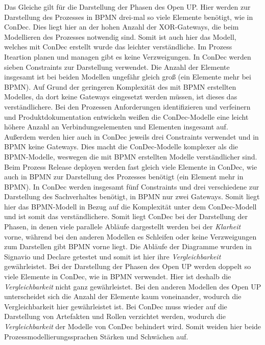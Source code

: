 Das Gleiche gilt für die Darstellung der Phasen des Open UP. Hier werden zur Darstellung des Prozesses in BPMN drei-mal so viele Elemente benötigt, wie in ConDec. Dies liegt hier an der hohen Anzahl der XOR-Gateways, die beim Modellieren des Prozesses notwendig sind. Somit ist auch hier das Modell, welches mit ConDec erstellt wurde das leichter verständliche. \newline
Im Prozess Iteartion planen und managen gibt es keine Verzweigungen. In ConDec werden sieben Constraints zur Darstellung verwendet. Die Anzahl der Elemente insgesamt ist bei beiden Modellen ungefähr gleich groß (ein Elemente mehr bei BPMN). Auf Grund der geringeren Komplexität des mit BPMN erstellten Modelles, da dort keine Gateways eingesetzt werden müssen, ist dieses das verständlichere.\newline
Bei den Prozessen Anforderungen identifizieren und verfeinern und Produktdokumentation entwickeln weißen die ConDec-Modelle eine leicht höhere Anzahl an Verbindungselementen und Elementen insgesamt auf. Außerdem werden hier auch in ConDec jeweils drei Constraints verwendet und in BPMN keine Gateways. Dies macht die ConDec-Modelle komplexer als die BPMN-Modelle, weswegen die mit BPMN erstellten Modelle verständlicher sind.\newline
Beim Prozess Release deployen werden fast gleich viele Elemente in ConDec, wie auch in BPMN zur Darstellung des Prozesses benötigt (ein Element mehr in BPMN). In ConDec werden insgesamt fünf Constraints und drei verschiedene zur Darstellung des Sachverhaltes benötigt, in BPMN nur zwei Gateways. Somit liegt hier das BPMN-Modell in Bezug auf die Komplexität unter dem ConDec-Modell und ist somit das verständlichere.\newline
Somit liegt ConDec bei der Darstellung der Phasen, in denen viele parallele Abläufe dargestellt werden bei der \textit{Klarheit} vorne, während bei den anderen Modellen es Schleifen oder keine Verzweigungen zum Darstellen gibt BPMN vorne liegt.\newline
Die Abläufe der Diagramme wurden in Signavio und Declare getestet und somit ist hier ihre \textit{Vergleichbarkeit} gewährleistet.\newline
Bei der Darstellung der Phasen des Open UP werden doppelt so viele Elemente in ConDec, wie in BPMN verwendet. Hier ist deshalb die \textit{Vergleichbarkeit} nicht ganz gewährleistet. Bei den anderen Modellen des Open UP unterscheidet sich die Anzahl der Elemente kaum voneinander, wodurch die Vergleichbarkeit hier gewährleistet ist. \newline
Bei ConDec muss wieder auf die Darstellung von Artefakten und Rollen verzichtet werden, wodurch die \textit{Vergleichbarkeit} der Modelle von ConDec behindert wird. Somit weiden hier beide Prozessmodellierungssprachen Stärken und Schwächen auf.\newline

